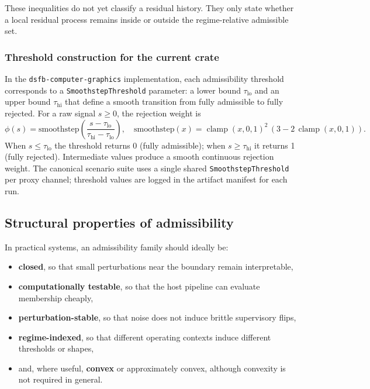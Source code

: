 \documentclass[11pt,letterpaper]{article}
\theoremstyle{gcresult}
\theoremstyle{definition}
\begin{document}
These inequalities do not yet classify a residual history. They only state whether a local residual process remains inside or outside the regime-relative admissible set.

\subsubsection{Threshold construction for the current crate}
\label{sec:threshold-construction}

In the \texttt{dsfb-computer-graphics} implementation, each admissibility threshold corresponds to a \texttt{SmoothstepThreshold} parameter: a lower bound $\tau_{\mathrm{lo}}$ and an upper bound $\tau_{\mathrm{hi}}$ that define a smooth transition from fully admissible to fully rejected. For a raw signal $s \ge 0$, the rejection weight is
\begin{equation}
\phi(s) = \mathrm{smoothstep}\!\left(\frac{s - \tau_{\mathrm{lo}}}{\tau_{\mathrm{hi}} - \tau_{\mathrm{lo}}}\right), \quad
\mathrm{smoothstep}(x) = \operatorname{clamp}(x,0,1)^2\,(3 - 2\,\operatorname{clamp}(x,0,1)).
\end{equation}
When $s \le \tau_{\mathrm{lo}}$ the threshold returns 0 (fully admissible); when $s \ge \tau_{\mathrm{hi}}$ it returns 1 (fully rejected). Intermediate values produce a smooth continuous rejection weight. The canonical scenario suite uses a single shared \texttt{SmoothstepThreshold} per proxy channel; threshold values are logged in the artifact manifest for each run.


\subsection{Structural properties of admissibility}

In practical systems, an admissibility family should ideally be:
\begin{itemize}[leftmargin=1.5em]
    \item \textbf{closed}, so that small perturbations near the boundary remain interpretable,
    \item \textbf{computationally testable}, so that the host pipeline can evaluate membership cheaply,
    \item \textbf{perturbation-stable}, so that noise does not induce brittle supervisory flips,
    \item \textbf{regime-indexed}, so that different operating contexts induce different thresholds or shapes,
    \item and, where useful, \textbf{convex} or approximately convex, although convexity is not required in general.
\end{itemize}
\end{document}

